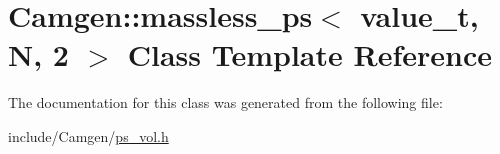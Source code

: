 \hypertarget{a00358}{}\section{Camgen\+:\+:massless\+\_\+ps$<$ value\+\_\+t, N, 2 $>$ Class Template Reference}
\label{a00358}


The documentation for this class was generated from the following file\+:\begin{DoxyCompactItemize}
\item 
include/\+Camgen/\hyperlink{a00746}{ps\+\_\+vol.\+h}\end{DoxyCompactItemize}
